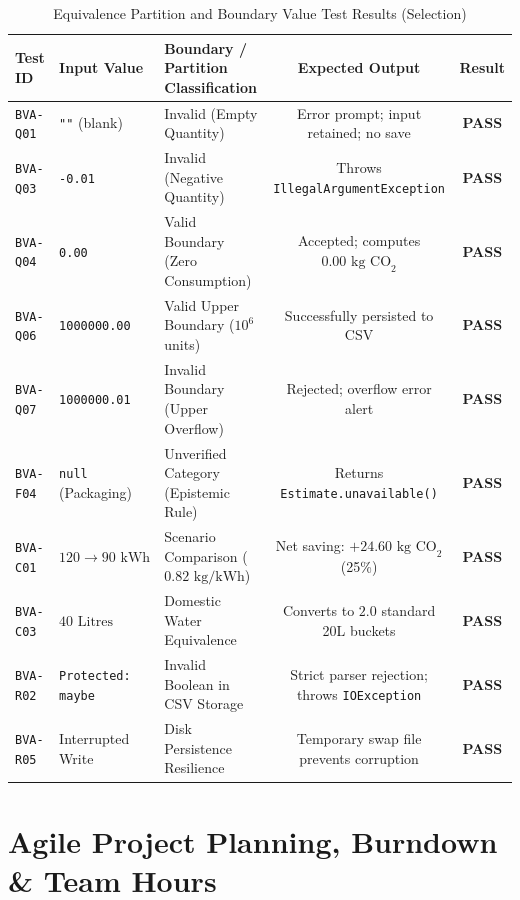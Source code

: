 \documentclass[12pt,a4paper]{article}
\begin{document}
\begin{table}[htbp]
\centering
\footnotesize
\caption{Equivalence Partition and Boundary Value Test Results (Selection)}
\label{tab:bva}
\begin{tabularx}{\textwidth}{llXcc}
\toprule
\textbf{Test ID} & \textbf{Input Value} & \textbf{Boundary / Partition Classification} & \textbf{Expected Output} & \textbf{Result} \\
\midrule
\texttt{BVA-Q01} & \texttt{""} (blank) & Invalid (Empty Quantity) & Error prompt; input retained; no save & \textbf{PASS} \\
\texttt{BVA-Q03} & \texttt{-0.01} & Invalid (Negative Quantity) & Throws \texttt{IllegalArgumentException} & \textbf{PASS} \\
\texttt{BVA-Q04} & \texttt{0.00} & Valid Boundary (Zero Consumption) & Accepted; computes $0.00\text{ kg CO}_2$ & \textbf{PASS} \\
\texttt{BVA-Q06} & \texttt{1000000.00} & Valid Upper Boundary ($10^6$ units) & Successfully persisted to CSV & \textbf{PASS} \\
\texttt{BVA-Q07} & \texttt{1000000.01} & Invalid Boundary (Upper Overflow) & Rejected; overflow error alert & \textbf{PASS} \\
\texttt{BVA-F04} & \texttt{null} (Packaging) & Unverified Category (Epistemic Rule) & Returns \texttt{Estimate.unavailable()} & \textbf{PASS} \\
\texttt{BVA-C01} & $120 \to 90\text{ kWh}$ & Scenario Comparison ($0.82\text{ kg/kWh}$) & Net saving: $+24.60\text{ kg CO}_2$ (25\%) & \textbf{PASS} \\
\texttt{BVA-C03} & $40\text{ Litres}$ & Domestic Water Equivalence & Converts to $2.0$ standard 20L buckets & \textbf{PASS} \\
\texttt{BVA-R02} & \texttt{Protected: maybe}& Invalid Boolean in CSV Storage & Strict parser rejection; throws \texttt{IOException} & \textbf{PASS} \\
\texttt{BVA-R05} & Interrupted Write & Disk Persistence Resilience & Temporary swap file prevents corruption & \textbf{PASS} \\
\bottomrule
\end{tabularx}
\end{table}

\section{Agile Project Planning, Burndown \& Team Hours}
\end{document}
